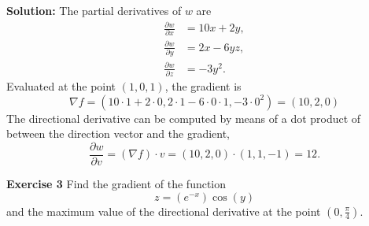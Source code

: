 \documentclass[12pt,oneside]{exam}
\newenvironment{exercise}[1]{\vspace{.1in}\noindent\textbf{Exercise #1 \hspace{.05em}}}{}
\newenvironment{newsolution}{\vspace{.1in}\noindent\textbf{Solution: \hspace{.05em}}}{}
\begin{document}
\begin{newsolution}
The partial derivatives of $w$ are 
\begin{align*}
\frac{\partial w}{\partial x} & = 10x+2y, \\
\frac{\partial w}{\partial y} & = 2x-6yz,\\
\frac{\partial w}{\partial z} & = -3y^2.
\end{align*}
Evaluated at the point $(1,0,1)$, the gradient is 
\begin{equation*}
\nabla f = (10\cdot 1 + 2 \cdot 0, 2\cdot 1 - 6 \cdot 0 \cdot 1, -3\cdot 0^2) = (10,2,0)
\end{equation*}
The directional derivative can be computed by means of a dot product of between the direction vector and the gradient, 
\begin{equation*}
\frac{\partial w}{\partial v} = (\nabla f) \cdot v = (10,2,0) \cdot (1,1,-1) = 12.
\end{equation*}
\end{newsolution}


\begin{exercise}{3}
Find the gradient of the function
\begin{equation*}
z = (e^{-x})\cos(y)
\end{equation*}
and the maximum value of the directional derivative at the point $\left(0,\frac{\pi}{4}\right).$
\end{exercise}
\end{document}
